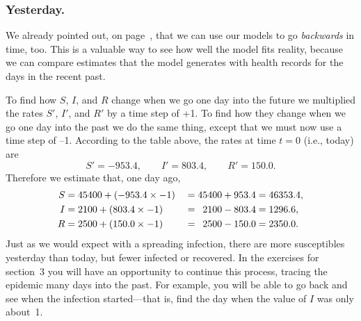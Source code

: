 \subsubsection{Yesterday.}
We already pointed out, on
page~\pageref{backwards}, that we can use our models to go {\em
  backwards\/} in time, too.  This is a valuable way to see how well
the model fits reality, because we can compare estimates that the
model generates with health records for the days in the recent past.

To find how $S$, $I$, and $R$ change when we go one day into the
future we multiplied the rates $S'$, $I'$, and $R'$ by a time step of
+1.  To find how they change when we go one day into the past we do
the same thing, except that we must now use a time step of --1.
According to the table above, the rates at time $t = 0$ (i.e., today)
are
\[
S' = -953.4, \qquad I' = 803.4, \qquad R' = 150.0.
\]
Therefore we estimate that, one day ago, 
\begin{alignat*}{2}
S &= 45400 + (-953.4 \times -1)\; &= 45400 + 953.4 
		&=  46353.4,\\
I &= 2100 + (803.4 \times -1)   &= \hphantom{0}2100 - 803.4 
		&= 1296.6,  \\
R &= 2500 + (150.0 \times -1)   &= \hphantom{0}2500 - 150.0 
		&= 2350.0.  
\end{alignat*}
Just as we would expect with a spreading infection, there are more
susceptibles yesterday than today, but fewer infected or recovered.
In the exercises for section~3 you will have an opportunity to continue
this process, tracing the epidemic many days into the past.  For
example, you will be able to go back and see when the infection
started---that is, find the day when the value of $I$ was only about~1.





